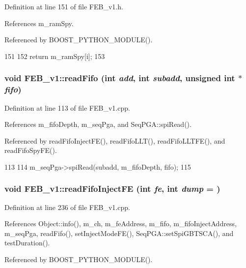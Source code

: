 Definition at line 151 of file FEB\_\-v1.h.

References m\_\-ramSpy.

Referenced by BOOST\_\-PYTHON\_\-MODULE().


\begin{DoxyCode}
151                      {
152     return m_ramSpy[i];
153   }
\end{DoxyCode}
\hypertarget{classFEB__v1_af945f99a912c5ad076ebdb03dbb6c139}{
\subsubsection[{readFifo}]{\setlength{\rightskip}{0pt plus 5cm}void FEB\_\-v1::readFifo (int {\em add}, \/  int {\em subadd}, \/  unsigned int $\ast$ {\em fifo})}}
\label{classFEB__v1_af945f99a912c5ad076ebdb03dbb6c139}


Definition at line 113 of file FEB\_\-v1.cpp.

References m\_\-fifoDepth, m\_\-seqPga, and SeqPGA::spiRead().

Referenced by readFifoInjectFE(), readFifoLLT(), readFifoLLTFE(), and readFifoSpyFE().


\begin{DoxyCode}
113                                                               {
114   m_seqPga->spiRead(subadd, m_fifoDepth, fifo);
115 }
\end{DoxyCode}
\hypertarget{classFEB__v1_ab370d9f02895e1a44ab19d320255123e}{
\subsubsection[{readFifoInjectFE}]{\setlength{\rightskip}{0pt plus 5cm}void FEB\_\-v1::readFifoInjectFE (int {\em fe}, \/  int {\em dump} = {})}}
\label{classFEB__v1_ab370d9f02895e1a44ab19d320255123e}


Definition at line 236 of file FEB\_\-v1.cpp.

References Object::info(), m\_\-ch, m\_\-feAddress, m\_\-fifo, m\_\-fifoInjectAddress, m\_\-seqPga, readFifo(), setInjectModeFE(), SeqPGA::setSpiGBTSCA(), and testDuration().

Referenced by BOOST\_\-PYTHON\_\-MODULE().


